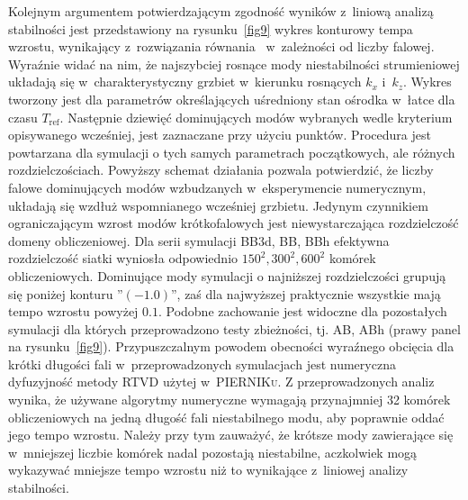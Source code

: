 \par Kolejnym argumentem potwierdzającym zgodność wyników z~liniową analizą
stabilności jest przedstawiony na rysunku~\ref{fig9} wykres konturowy tempa
wzrostu, wynikający z~rozwiązania równania~ w~zależności od
liczby falowej. Wyraźnie widać na nim, że najszybciej rosnące mody
niestabilności strumieniowej układają się w~charakterystyczny grzbiet w~kierunku
rosnących $k_x$ i~$k_z$.  Wykres tworzony jest dla parametrów określających
uśredniony stan ośrodka w~łatce dla czasu $T_{\textrm{ref}}$.  Następnie
dziewięć dominujących modów wybranych wedle kryterium opisywanego wcześniej,
jest zaznaczane przy użyciu punktów. Procedura jest powtarzana dla symulacji o
tych samych parametrach początkowych, ale różnych rozdzielczościach.  Powyższy
schemat działania pozwala potwierdzić, że liczby falowe dominujących modów
wzbudzanych w~eksperymencie numerycznym, układają się wzdłuż wspomnianego
wcześniej grzbietu. Jedynym czynnikiem ograniczającym wzrost modów
krótkofalowych jest niewystarczająca rozdzielczość domeny obliczeniowej. Dla
serii symulacji BB3d, BB, BBh efektywna rozdzielczość siatki wyniosła
odpowiednio $150^2, 300^2, 600^2$ komórek obliczeniowych.  Dominujące mody
symulacji o najniższej rozdzielczości grupują się poniżej konturu ''$(-1.0)$'',
zaś dla najwyższej praktycznie wszystkie mają tempo wzrostu powyżej $0.1$.
Podobne zachowanie jest widoczne dla pozostałych symulacji dla których
przeprowadzono testy zbieżności, tj. AB, ABh (prawy panel na
rysunku~\ref{fig9}). Przypuszczalnym powodem obecności wyraźnego obcięcia dla
krótki długości fali w~przeprowadzonych symulacjach jest numeryczna
dyfuzyjność metody RTVD użytej w~\textsc{PIERNIKu}. Z przeprowadzonych analiz wynika, że
używane algorytmy numeryczne wymagają przynajmniej 32 komórek obliczeniowych
na jedną długość fali niestabilnego modu, aby poprawnie oddać jego tempo
wzrostu.  Należy przy tym zauważyć, że krótsze mody zawierające się w~mniejszej
liczbie komórek nadal pozostają niestabilne, aczkolwiek mogą wykazywać mniejsze
tempo wzrostu niż to wynikające z~liniowej analizy stabilności.
%
